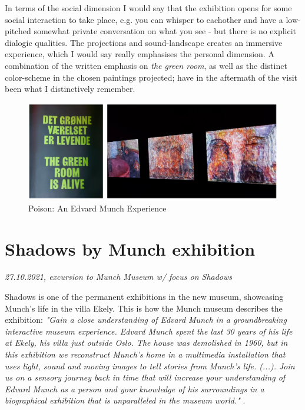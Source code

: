In terms of the social dimension I would say that the exhibition opens for some social interaction to take place, e.g. you can whisper to eachother and have a low-pitched somewhat private conversation on what you see - but there is no explicit dialogic qualities. The projections and sound-landscape creates an immersive experience, which I would say really emphasises the personal dimension. A combination of the written emphasis on \emph{the green room}, as well as the distinct color-scheme in the chosen paintings projected; have in the aftermath of the visit been what I distinctively remember. 

\begin{figure}[H]
\includegraphics[width=12.5cm]{pictures/process/poison_alive.png}
\caption{Poison: An Edvard Munch Experience}
\centering 
\end{figure}


\section{Shadows by Munch exhibition}
\par
\emph{27.10.2021, excursion to Munch Museum w/ focus on Shadows}
\par

Shadows is one of the permanent exhibitions in the new museum, showcasing Munch's life in the villa Ekely. This is how the Munch museum describes the exhibition: \emph{"Gain a close understanding of Edvard Munch in a groundbreaking interactive museum experience.
Edvard Munch spent the last 30 years of his life at Ekely, his villa just outside Oslo. The house was demolished in 1960, but in this exhibition we reconstruct Munch’s home in a multimedia installation that uses light, sound and moving images to tell stories from Munch’s life. (...). Join us on a sensory journey back in time that will increase your understanding of Edvard Munch as a person and your knowledge of his surroundings in a biographical exhibition that is unparalleled in the museum world."} \autocite{munch_shadows_web}.


